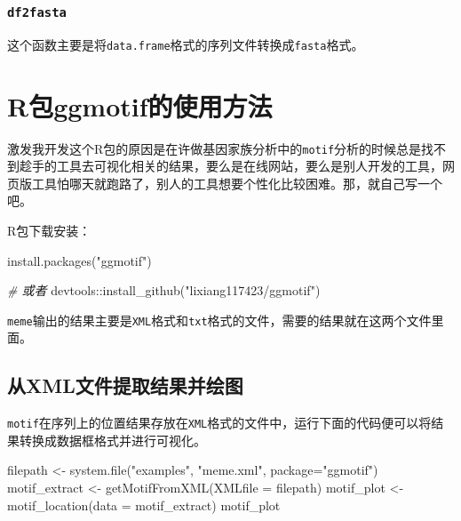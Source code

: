 \documentclass[
  10pt,
]{book}
\newenvironment{Shaded}{\begin{snugshade}}{\end{snugshade}}
\newcommand{\AttributeTok}[1]{\textcolor[rgb]{0.77,0.63,0.00}{#1}}
\newcommand{\CommentTok}[1]{\textcolor[rgb]{0.56,0.35,0.01}{\textit{#1}}}
\newcommand{\FunctionTok}[1]{\textcolor[rgb]{0.00,0.00,0.00}{#1}}
\newcommand{\NormalTok}[1]{#1}
\newcommand{\OtherTok}[1]{\textcolor[rgb]{0.56,0.35,0.01}{#1}}
\newcommand{\SpecialCharTok}[1]{\textcolor[rgb]{0.00,0.00,0.00}{#1}}
\newcommand{\StringTok}[1]{\textcolor[rgb]{0.31,0.60,0.02}{#1}}
\begin{document}
\hypertarget{df2fasta}{%
\subsubsection{\texorpdfstring{\texttt{df2fasta}}{df2fasta}}\label{df2fasta}}

这个函数主要是将\texttt{data.frame}格式的序列文件转换成\texttt{fasta}格式。

\hypertarget{ggmotif}{%
\section{R包ggmotif的使用方法}\label{ggmotif}}

激发我开发这个R包的原因是在许做基因家族分析中的\texttt{motif}分析的时候总是找不到趁手的工具去可视化相关的结果，要么是在线网站，要么是别人开发的工具，网页版工具怕哪天就跑路了，别人的工具想要个性化比较困难。那，就自己写一个吧。

R包下载安装：

\begin{Shaded}
\begin{Highlighting}[]
\FunctionTok{install.packages}\NormalTok{(}\StringTok{"ggmotif"}\NormalTok{)}

\CommentTok{\# 或者}
\NormalTok{devtools}\SpecialCharTok{::}\FunctionTok{install\_github}\NormalTok{(}\StringTok{"lixiang117423/ggmotif"}\NormalTok{)}
\end{Highlighting}
\end{Shaded}

\texttt{meme}输出的结果主要是\texttt{XML}格式和\texttt{txt}格式的文件，需要的结果就在这两个文件里面。

\hypertarget{ux4ecexmlux6587ux4ef6ux63d0ux53d6ux7ed3ux679cux5e76ux7ed8ux56fe}{%
\subsection{从XML文件提取结果并绘图}\label{ux4ecexmlux6587ux4ef6ux63d0ux53d6ux7ed3ux679cux5e76ux7ed8ux56fe}}

\texttt{motif}在序列上的位置结果存放在\texttt{XML}格式的文件中，运行下面的代码便可以将结果转换成数据框格式并进行可视化。

\begin{Shaded}
\begin{Highlighting}[]
\NormalTok{filepath }\OtherTok{\textless{}{-}} \FunctionTok{system.file}\NormalTok{(}\StringTok{"examples"}\NormalTok{, }\StringTok{"meme.xml"}\NormalTok{, }\AttributeTok{package=}\StringTok{"ggmotif"}\NormalTok{)}
\NormalTok{motif\_extract }\OtherTok{\textless{}{-}} \FunctionTok{getMotifFromXML}\NormalTok{(}\AttributeTok{XMLfile =}\NormalTok{ filepath)}
\NormalTok{motif\_plot }\OtherTok{\textless{}{-}} \FunctionTok{motif\_location}\NormalTok{(}\AttributeTok{data =}\NormalTok{ motif\_extract)}
\NormalTok{motif\_plot}
\end{Highlighting}
\end{Shaded}
\end{document}
